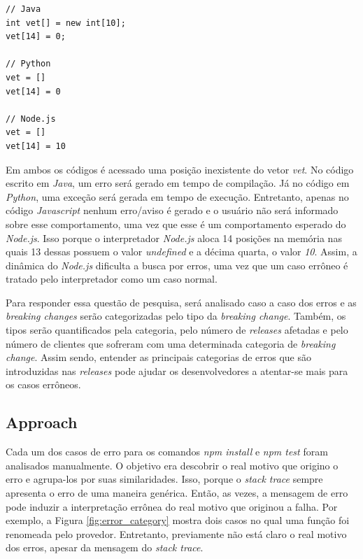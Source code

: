 \begin{lstlisting}[style=javascript, label=cod:wrong:access, caption={Acesso inválido à posição de memória}, numbers=none]
// Java
int vet[] = new int[10];
vet[14] = 0;

// Python
vet = []
vet[14] = 0

// Node.js
vet = []
vet[14] = 10
\end{lstlisting}

Em ambos os códigos é acessado uma posição inexistente do vetor \textit{vet}. No código escrito em \textit{Java}, um erro será gerado em tempo de compilação. Já no código em \textit{Python}, uma exceção será gerada em tempo de execução. Entretanto, apenas no código \textit{Javascript} nenhum erro/aviso é gerado e o usuário não será informado sobre esse comportamento, uma vez que esse é um comportamento esperado do \textit{Node.js}. Isso porque o interpretador \textit{Node.js} aloca 14 posições na memória nas quais 13 dessas possuem o valor \textit{undefined} e a décima quarta, o valor \textit{10}. Assim, a dinâmica do \textit{Node.js} dificulta a busca por erros, uma vez que um caso errôneo é tratado pelo interpretador como um caso normal.

Para responder essa questão de pesquisa, será analisado caso a caso dos erros e as \textit{breaking changes} serão categorizadas pelo tipo da \textit{breaking change}. Também, os tipos serão quantificados pela categoria, pelo número de \textit{releases} afetadas e pelo número de clientes que sofreram com uma determinada categoria de \textit{breaking change}. Assim sendo, entender as principais categorias de erros que são introduzidas nas \textit{releases} pode ajudar os desenvolvedores a atentar-se mais para os casos errôneos.

\subsection{Approach}
\label{apr:rq2}

Cada um dos casos de erro para os comandos \textit{npm install} e \textit{npm test} foram analisados manualmente. O objetivo era descobrir o real motivo que origino o erro e agrupa-los por suas similaridades. Isso, porque o \textit{stack trace} sempre apresenta o erro de uma maneira genérica. Então, as vezes, a mensagem de erro pode induzir a interpretação errônea do real motivo que originou a falha. Por exemplo, a Figura \ref{fig:error_category} mostra dois casos no qual uma função foi renomeada pelo provedor. Entretanto, previamente não está claro o real motivo dos erros, apesar da mensagem do \textit{stack trace}.

